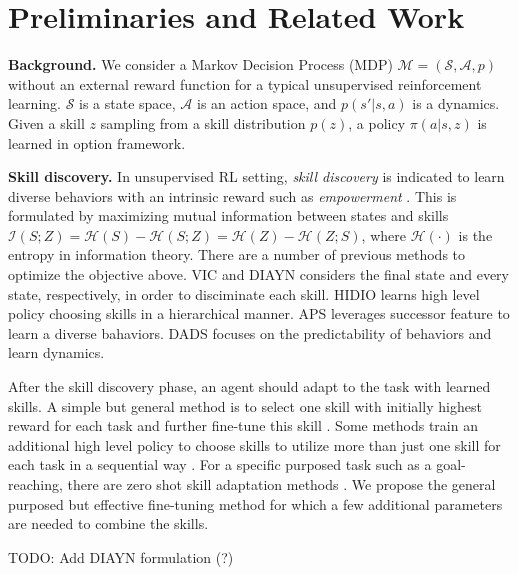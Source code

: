 \section{Preliminaries and Related Work}
\textbf{Background.} We consider a Markov Decision Process (MDP) $\mathcal{M}=(\mathcal{S}, \mathcal{A}, p)$ without an external reward function for a typical unsupervised reinforcement learning. $\mathcal{S}$ is a state space, $\mathcal{A}$ is an action space, and $p(s'| s, a)$ is a dynamics. Given a skill $z$ sampling from a skill distribution $p(z)$, a policy $\pi(a | s, z)$ is learned in option framework.


\textbf{Skill discovery.} In unsupervised RL setting, \emph{skill discovery} is indicated to learn diverse behaviors with an intrinsic reward such as \emph{empowerment} \cite{salge2014empowerment}. This is formulated by maximizing mutual information between states and skills $\mathcal{I}(S; Z) = \mathcal{H}(S) - \mathcal{H}(S; Z) = \mathcal{H}(Z) - \mathcal{H}(Z; S)$, where $\mathcal{H}(\cdot)$ is the entropy in information theory. There are a number of previous methods to optimize the objective above. VIC \cite{gregor2016variational} and DIAYN \cite{eysenbach2018diversity} considers the final state and every state, respectively, in order to disciminate each skill. HIDIO \cite{zhang2021hierarchical} learns high level policy choosing skills in a hierarchical manner. APS \cite{liu2021aps} leverages successor feature to learn a diverse bahaviors. DADS \cite{sharma2019dynamics} focuses on the predictability of behaviors and learn dynamics. 


After the skill discovery phase, an agent should adapt to the task with learned skills. A simple but general method is to select one skill with initially highest reward for each task and further fine-tune this skill \cite{eysenbach2018diversity, laskin2022cic}. Some methods train an additional high level policy to choose skills to utilize more than just one skill for each task in a sequential way \cite{sharma2019dynamics}. For a specific purposed task such as a goal-reaching, there are zero shot skill adaptation methods \cite{sharma2019dynamics, choi2021variational}. We propose the general purposed but effective fine-tuning method for which a few additional parameters are needed to combine the skills.

TODO: Add DIAYN formulation (?)